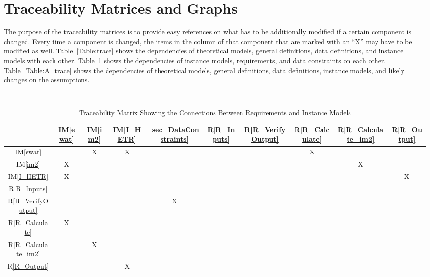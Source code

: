 \documentclass[12pt]{article}
\newcommand{\iref}[1]{IM\ref{#1}}
\newcommand{\rref}[1]{R\ref{#1}}
\begin{document}
\section{Traceability Matrices and Graphs}

The purpose of the traceability matrices is to provide easy references on what
has to be additionally modified if a certain component is changed.  Every time a
component is changed, the items in the column of that component that are marked
with an ``X'' may have to be modified as well.  Table~\ref{Table:trace} shows the
dependencies of theoretical models, general definitions, data definitions, and
instance models with each other. Table~\ref{Table:R_trace} shows the
dependencies of instance models, requirements, and data constraints on each
other. Table~\ref{Table:A_trace} shows the dependencies of theoretical models,
general definitions, data definitions, instance models, and likely changes on
the assumptions.

~\newline

\begin{table}[h!]
\centering
\begin{tabular}{|c|c|c|c|c|c|c|c|c|c|}
\hline
	& \iref{ewat}& \iref{im2} & \iref{I_HETR}& \ref{sec_DataConstraints}& \rref{R_Inputs}& \rref{R_VerifyOutput} & \rref{R_Calculate} & \rref{R_Calculate_im2} & \rref{R_Output} \\
\hline
\iref{ewat}            & & X& X& & & &X & &  \\ \hline
\iref{im2}             &X &  & & & &  & &X &\\ \hline
\iref{I_HETR}            & X& & & & & & & &X\\ \hline
\rref{R_Inputs}     & & & & & & & & &\\ \hline
\rref{R_VerifyOutput}  & & & &X & & & & & \\ \hline
\rref{R_Calculate}    &X & & & & & & & &\\ \hline
\rref{R_Calculate_im2} & & X& & & & & & & \\ \hline
\rref{R_Output}  & & &X & & & &  & &\\ 
\hline
\end{tabular}
\caption{Traceability Matrix Showing the Connections Between Requirements and Instance Models}
\label{Table:R_trace}
\end{table}
\end{document}
